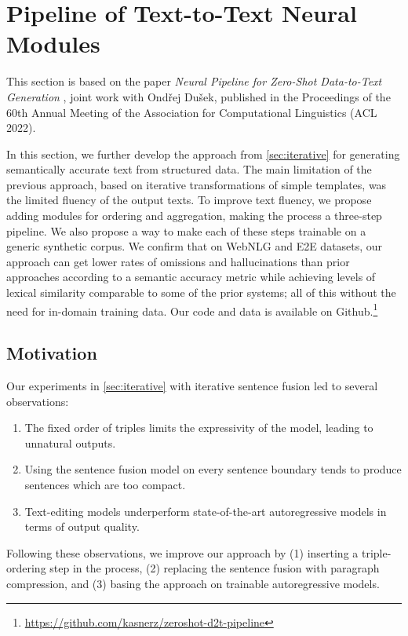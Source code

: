\section{Pipeline of Text-to-Text Neural Modules}
\label{sec:pipeline}
\begin{refbox}
    This section is based on the paper \emph{Neural Pipeline for Zero-Shot Data-to-Text Generation} \cite{kasner2022neural}, joint work with Ondřej Dušek, published in the Proceedings of the 60th Annual Meeting of the Association for Computational Linguistics (ACL 2022).
\end{refbox}

In this section, we further develop the approach from \autoref{sec:iterative} for generating semantically accurate text from structured data. The main limitation of the previous approach, based on iterative transformations of simple templates, was the limited fluency of the output texts. To improve text fluency, we propose adding modules for ordering and aggregation, making the process a three-step pipeline. We also propose a way to make each of these steps trainable on a generic synthetic corpus. We confirm that on WebNLG and E2E datasets, our approach can get lower rates of omissions and hallucinations than prior approaches according to a semantic accuracy metric while achieving levels of lexical similarity comparable to some of the prior systems; all of this without the need for in-domain training data. Our code and data is available on Github.\footnote{\url{https://github.com/kasnerz/zeroshot-d2t-pipeline}}


\subsection{Motivation}
Our experiments in \autoref{sec:iterative} with iterative sentence fusion led to several observations:

\begin{enumerate}
    \item The fixed order of triples limits the expressivity of the model, leading to unnatural outputs.
    \item Using the sentence fusion model on every sentence boundary tends to produce sentences which are too compact.
    \item Text-editing models underperform state-of-the-art autoregressive models in terms of output quality.
\end{enumerate}

Following these observations, we improve our approach by (1) inserting a triple-ordering step in the process, (2) replacing the sentence fusion with paragraph compression, and (3) basing the approach on trainable autoregressive models.



